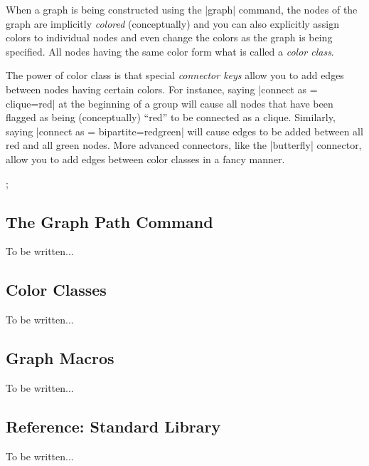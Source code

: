 When a graph is being constructed using the |graph| command, the nodes
of the graph are implicitly \emph{colored} (conceptually) and you can
also explicitly assign colors to individual nodes and even change the
colors as the graph is being specified. All nodes having the same
color form what is called a \emph{color class}.

The power of color class is that special \emph{connector keys} allow
you to add edges between nodes having certain colors. For instance,
saying |connect as = {clique=red}| at the beginning of a group will
cause all nodes that have been flagged as being (conceptually) ``red''
to be connected as a clique. Similarly, saying
|connect as = {bipartite={red}{green}}| will cause edges to be added
between all red and all green nodes. More advanced connectors, like
the |butterfly| connector, allow you to add edges between color
classes in a fancy manner.


\begin{codeexample}[]
\tikz [x=8mm, y=6mm, font=\footnotesize, circle]
  ;
\end{codeexample}


\subsection{The Graph Path Command}

To be written...


\subsection{Color Classes}

To be written...


\subsection{Graph Macros}

To be written...


\subsection{Reference: Standard Library}

To be written...

